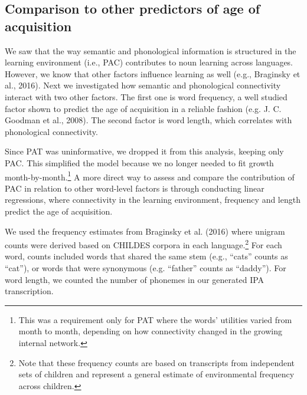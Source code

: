 \documentclass[english,floatsintext,man]{apa6}
\theoremstyle{definition}
\theoremstyle{definition}
\theoremstyle{definition}
\theoremstyle{remark}
\begin{document}
\subsection{Comparison to other predictors of age of
acquisition}\label{comparison-to-other-predictors-of-age-of-acquisition}

We saw that the way semantic and phonological information is structured
in the learning environment (i.e., PAC) contributes to noun learning
across languages. However, we know that other factors influence learning
as well (e.g., Braginsky et al., 2016). Next we investigated how
semantic and phonological connectivity interact with two other factors.
The first one is word frequency, a well studied factor shown to predict
the age of acquisition in a reliable fashion (e.g. J. C. Goodman et al.,
2008). The second factor is word length, which correlates with
phonological connectivity.

Since PAT was uninformative, we dropped it from this analysis, keeping
only PAC. This simplified the model because we no longer needed to fit
growth
month-by-month.\footnote{This was a requirement only for PAT where the words' utilities varied from month to month, depending on how connectivity changed in the growing internal network.}
A more direct way to assess and compare the contribution of PAC in
relation to other word-level factors is through conducting linear
regressions, where connectivity in the learning environment, frequency
and length predict the age of acquisition.

We used the frequency estimates from Braginsky et al. (2016) where
unigram counts were derived based on CHILDES corpora in each
language.\footnote{Note that these frequency counts are based on transcripts from independent sets of children and represent a general estimate of environmental frequency across children.}
For each word, counts included words that shared the same stem (e.g.,
\enquote{cats} counts as \enquote{cat}), or words that were synonymous
(e.g. \enquote{father} counts as \enquote{daddy}). For word length, we
counted the number of phonemes in our generated IPA transcription.
\end{document}
